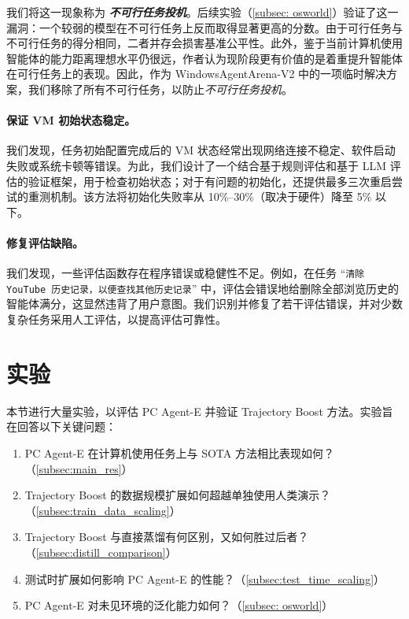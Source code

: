 \documentclass[10pt]{article}
\begin{document}
我们将这一现象称为 \textbf{\textit{不可行任务投机}}。后续实验（\autoref{subsec: osworld}）验证了这一漏洞：一个较弱的模型在不可行任务上反而取得显著更高的分数。由于可行任务与不可行任务的得分相同，二者并存会损害基准公平性。此外，鉴于当前计算机使用智能体的能力距离理想水平仍很远，作者认为现阶段更有价值的是着重提升智能体在可行任务上的表现。因此，作为 WindowsAgentArena-V2 中的一项临时解决方案，我们移除了所有不可行任务，以防止\textit{不可行任务投机}。

\paragraph{保证 VM 初始状态稳定。}
我们发现，任务初始配置完成后的 VM 状态经常出现网络连接不稳定、软件启动失败或系统卡顿等错误。为此，我们设计了一个结合基于规则评估和基于 LLM 评估的验证框架，用于检查初始状态；对于有问题的初始化，还提供最多三次重启尝试的重测机制。该方法将初始化失败率从 10\%--30\%（取决于硬件）降至 5\% 以下。

\paragraph{修复评估缺陷。}
我们发现，一些评估函数存在程序错误或稳健性不足。例如，在任务 ``\texttt{清除 YouTube 历史记录，以便查找其他历史记录}'' 中，评估会错误地给删除全部浏览历史的智能体满分，这显然违背了用户意图。我们识别并修复了若干评估错误，并对少数复杂任务采用人工评估，以提高评估可靠性。

\section{实验}
\label{sec: experiment}

本节进行大量实验，以评估 PC Agent-E 并验证 Trajectory Boost 方法。实验旨在回答以下关键问题：

\begin{enumerate}
    \item PC Agent-E 在计算机使用任务上与 SOTA 方法相比表现如何？（\autoref{subsec:main_res}）
    \item Trajectory Boost 的数据规模扩展如何超越单独使用人类演示？（\autoref{subsec:train_data_scaling}）
    \item Trajectory Boost 与直接蒸馏有何区别，又如何胜过后者？（\autoref{subsec:distill_comparison}）
    \item 测试时扩展如何影响 PC Agent-E 的性能？（\autoref{subsec:test_time_scaling}）
    \item PC Agent-E 对未见环境的泛化能力如何？（\autoref{subsec: osworld}）
\end{enumerate}
\end{document}
